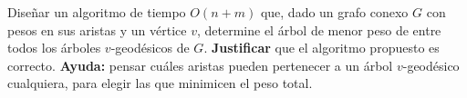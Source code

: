 

 \item Diseñar un algoritmo de tiempo $O(n+m)$ que, dado un grafo conexo $G$ con pesos en sus aristas y un vértice $v$, determine el árbol de menor peso de entre todos los árboles $v$-geodésicos de $G$.   \textbf{Justificar} que el algoritmo propuesto es correcto.  \textbf{Ayuda:} pensar cuáles aristas pueden pertenecer a un árbol $v$-geodésico cualquiera, para elegir las que minimicen el peso total.



